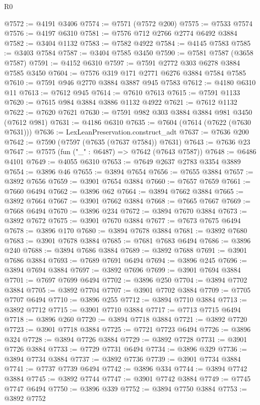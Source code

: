 \begin{lexlean}{R0}
\begin{coremodule}
@7572 := @4191 @3406
@7574 := @7571 (@7572 @200)
@7575 := @7533 @7574
@7576 := @4197 @6310
@7581 := @7576 @712 @2766 @2774 @6492 @3884
@7582 := @3404 @1132
@7583 := @7582 @4922
@7584 := @4145 @7583
@7585 := @3403 @7584
@7587 := @3404 @7585 @3450
@7590 := @7581 @7587 (@3658 @7587)
@7591 := @4152 @6310
@7597 := @7591 @2772 @303 @6278 @3884 @7585 @3450
@7604 := @7576 @319 @171 @2771 @6276 @3884 @7584 @7585
@7610 := @7591 @946 @2770 @3884 @3887 @945 @7583
@7612 := @4180 @6310 @11
@7613 := @7612 @945
@7614 := @7610 @7613
@7615 := @7591 @1133
@7620 := @7615 @984 @3884 @3886 @1132 @4922
@7621 := @7612 @1132
@7622 := @7620 @7621
@7630 := @7591 @982 @303 @3884 @3884 @981 @3450 (@7612 @981)
@7631 := @4186 @6310
@7635 := @7604 (@7614 (@7622 (@7630 @7631)))
@7636 := LexLeanPreservation.construct_adt
@7637 := @7636 @200
@7642 := @7590 (@7597 (@7635 (@7637 @7584)) @7631)
@7643 := @7636 @23
@7647 := @7575 (fun ("_" : @6487) => @7642 (@7643 @7587))
@7648 := @6486 @4101
@7649 := @4055 @6310
@7653 := @7649 @2637 @2783 @3354 @3889
@7654 := @3896 @46
@7655 := @3894 @7654
@7656 := @7655 @3884
@7657 := @3892 @7656
@7659 := @3901 @7654 @3884
@7660 := @7657 @7659
@7661 := @7660 @6494
@7662 := @3896 @62
@7664 := @3894 @7662 @3884
@7665 := @3892 @7664
@7667 := @3901 @7662 @3884
@7668 := @7665 @7667
@7669 := @7668 @6494
@7670 := @3896 @234
@7672 := @3894 @7670 @3884
@7673 := @3892 @7672
@7675 := @3901 @7670 @3884
@7677 := @7673 @7675 @6494
@7678 := @3896 @170
@7680 := @3894 @7678 @3884
@7681 := @3892 @7680
@7683 := @3901 @7678 @3884
@7685 := @7681 @7683 @6494
@7686 := @3896 @240
@7688 := @3894 @7686 @3884
@7689 := @3892 @7688
@7691 := @3901 @7686 @3884
@7693 := @7689 @7691 @6494
@7694 := @3896 @245
@7696 := @3894 @7694 @3884
@7697 := @3892 @7696
@7699 := @3901 @7694 @3884
@7701 := @7697 @7699 @6494
@7702 := @3896 @250
@7704 := @3894 @7702 @3884
@7705 := @3892 @7704
@7707 := @3901 @7702 @3884
@7709 := @7705 @7707 @6494
@7710 := @3896 @255
@7712 := @3894 @7710 @3884
@7713 := @3892 @7712
@7715 := @3901 @7710 @3884
@7717 := @7713 @7715 @6494
@7718 := @3896 @260
@7720 := @3894 @7718 @3884
@7721 := @3892 @7720
@7723 := @3901 @7718 @3884
@7725 := @7721 @7723 @6494
@7726 := @3896 @324
@7728 := @3894 @7726 @3884
@7729 := @3892 @7728
@7731 := @3901 @7726 @3884
@7733 := @7729 @7731 @6494
@7734 := @3896 @329
@7736 := @3894 @7734 @3884
@7737 := @3892 @7736
@7739 := @3901 @7734 @3884
@7741 := @7737 @7739 @6494
@7742 := @3896 @334
@7744 := @3894 @7742 @3884
@7745 := @3892 @7744
@7747 := @3901 @7742 @3884
@7749 := @7745 @7747 @6494
@7750 := @3896 @339
@7752 := @3894 @7750 @3884
@7753 := @3892 @7752

\end{coremodule}
\end{lexlean}
